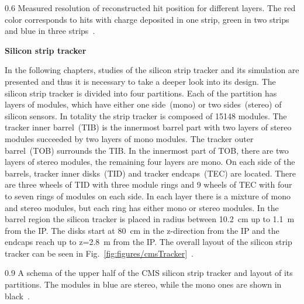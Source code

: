                  {0.6}       
                 {Measured resolution of reconstructed hit position for different layers. The red color corresponds to hits with charge deposited in one strip, green in two strips and blue in three strips~\cite{website:hitEff}. }


\textbf{Silicon strip tracker}


In the following chapters, studies of the silicon strip tracker and its simulation are presented and thus it is necessary to take a deeper look into its design. The silicon strip tracker is divided into four partitions. Each of the partition has layers of modules, which have either one side~(mono) or two sides~(stereo) of silicon sensors. In totality the strip tracker is composed of 15148 modules. The tracker inner barrel~(TIB) is the innermost barrel part with two layers of stereo modules succeeded by two layers of mono modules. The tracker outer barrel~(TOB) surrounds the TIB. In the innermost part of TOB, there are two layers of stereo modules, the remaining four layers are mono. On each side of the barrels, tracker inner disks~(TID) and tracker endcaps~(TEC) are located. There are three wheels of TID with three module rings and 9 wheels of TEC with four to seven rings of modules on each side. In each layer there is a mixture of mono and stereo modules, but each ring has either mono or stereo modules. In the barrel region the silicon tracker is placed in radius between 10.2~cm up to 1.1~m from the IP. The disks start at 80~cm in the z-direction from the IP and the endcaps reach up to z=2.8~m from the IP. The overall layout of the silicon strip tracker can be seen in Fig.~\ref{fig:figures/cmsTracker}~\cite{Chatrchyan:2014fea}.

                 {0.9}       
                 {A schema of the upper half of the CMS silicon strip tracker and layout of its partitions. The modules in blue are stereo, while the mono ones are shown in black~\cite{Chatrchyan:2014fea}. }

